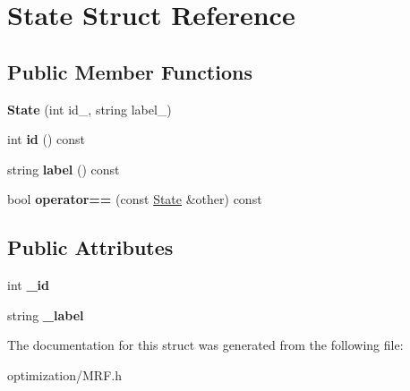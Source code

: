 \hypertarget{structState}{
\section{State Struct Reference}
\label{structState}
}
\subsection*{Public Member Functions}
\begin{DoxyCompactItemize}
\item 
\hypertarget{structState_aa536880320a9aff707fb1e6aab3f58d4}{
{\bfseries State} (int id\_\-, string label\_\-)}
\label{structState_aa536880320a9aff707fb1e6aab3f58d4}

\item 
\hypertarget{structState_aea25c6702974d1ac86358b4ba96d7891}{
int {\bfseries id} () const }
\label{structState_aea25c6702974d1ac86358b4ba96d7891}

\item 
\hypertarget{structState_a2809d0a34cd576cc5daaa7a6d0ffb2b5}{
string {\bfseries label} () const }
\label{structState_a2809d0a34cd576cc5daaa7a6d0ffb2b5}

\item 
\hypertarget{structState_a6687a56382a022034927ba43aad39524}{
bool {\bfseries operator==} (const \hyperlink{structState}{State} \&other) const }
\label{structState_a6687a56382a022034927ba43aad39524}

\end{DoxyCompactItemize}
\subsection*{Public Attributes}
\begin{DoxyCompactItemize}
\item 
\hypertarget{structState_ae0482e3d4b3db023647833efd344831a}{
int {\bfseries \_\-id}}
\label{structState_ae0482e3d4b3db023647833efd344831a}

\item 
\hypertarget{structState_a1bf6100c59d50bc94ba781230a85a2e5}{
string {\bfseries \_\-label}}
\label{structState_a1bf6100c59d50bc94ba781230a85a2e5}

\end{DoxyCompactItemize}


The documentation for this struct was generated from the following file:\begin{DoxyCompactItemize}
\item 
optimization/MRF.h\end{DoxyCompactItemize}

